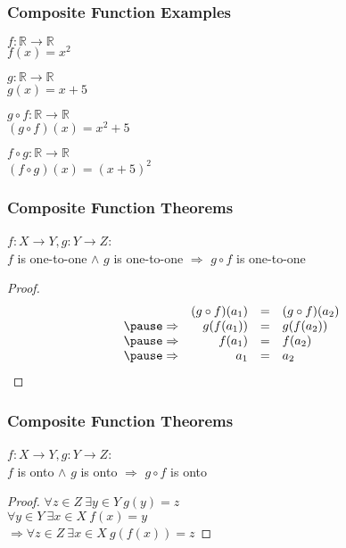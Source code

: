 \documentclass[dvipsnames]{beamer}
\begin{document}
\begin{frame}
  \frametitle{Composite Function Examples}

  \begin{example}[commutativity]
    $f: \mathbb{R} \rightarrow \mathbb{R}$\\
    $f(x) = x^2$

    \medskip
    $g: \mathbb{R} \rightarrow \mathbb{R}$\\
    $g(x) = x + 5$

    \pause
    \bigskip
    $g \circ f: \mathbb{R} \rightarrow \mathbb{R}$\\
    $(g \circ f)(x) = x^2 + 5$

    \pause
    \medskip
    $f \circ g: \mathbb{R} \rightarrow \mathbb{R}$\\
    $(f \circ g)(x) = (x + 5)^2$
  \end{example}
\end{frame}

\begin{frame}
  \frametitle{Composite Function Theorems}

  \begin{theorem}
    $f: X \rightarrow Y, g: Y \rightarrow Z$:\\
    $f$ is one-to-one $\wedge$ $g$ is one-to-one $\Rightarrow$ $g \circ f$ is one-to-one
  \end{theorem}

  \pause
  \begin{proof}
    \[\begin{array}{crcl}
                & (g \circ f) (a_1) & = & (g \circ f) (a_2)\\\pause
    \Rightarrow & g(f(a_1))         & = & g(f(a_2))\\\pause
    \Rightarrow & f(a_1)            & = & f(a_2)\\\pause
    \Rightarrow & a_1               & = & a_2
    \end{array}\]
  \end{proof}
\end{frame}

\begin{frame}
  \frametitle{Composite Function Theorems}

  \begin{theorem}
    $f: X \rightarrow Y, g: Y \rightarrow Z$:\\
    $f$ is onto $\wedge$ $g$ is onto $\Rightarrow$ $g \circ f$ is onto
  \end{theorem}

  \pause
  \begin{proof}
    $\forall z \in Z~\exists y \in Y~g(y) = z$\\\pause
    $\forall y \in Y~\exists x \in X~f(x) = y$\\\pause
      $\Rightarrow \forall z \in Z~\exists x \in X~g(f(x)) = z$
  \end{proof}
\end{frame}
\end{document}
